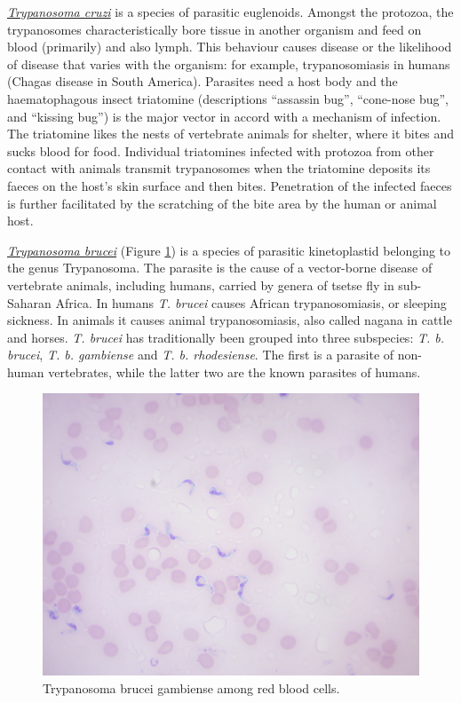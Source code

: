 \href{https://en.wikipedia.org/wiki/Trypanosoma_cruzi}{\emph{Trypanosoma
cruzi}} is a species of parasitic euglenoids. Amongst the protozoa, the
trypanosomes characteristically bore tissue in another organism and feed
on blood (primarily) and also lymph. This behaviour causes disease or
the likelihood of disease that varies with the organism: for example,
trypanosomiasis in humans (Chagas disease in South America). Parasites
need a host body and the haematophagous insect triatomine (descriptions
``assassin bug'', ``cone-nose bug'', and ``kissing bug'') is the major
vector in accord with a mechanism of infection. The triatomine likes the
nests of vertebrate animals for shelter, where it bites and sucks blood
for food. Individual triatomines infected with protozoa from other
contact with animals transmit trypanosomes when the triatomine deposits
its faeces on the host's skin surface and then bites. Penetration of the
infected faeces is further facilitated by the scratching of the bite
area by the human or animal host.

\href{https://en.wikipedia.org/wiki/Trypanosoma_brucei}{\emph{Trypanosoma
brucei}} (Figure \ref{fig:gambiense}) is a species of parasitic
kinetoplastid belonging to the genus Trypanosoma. The parasite is the
cause of a vector-borne disease of vertebrate animals, including humans,
carried by genera of tsetse fly in sub-Saharan Africa. In humans
\emph{T. brucei} causes African trypanosomiasis, or sleeping sickness.
In animals it causes animal trypanosomiasis, also called nagana in
cattle and horses. \emph{T. brucei} has traditionally been grouped into
three subspecies: \emph{T. b. brucei}, \emph{T. b. gambiense} and
\emph{T. b. rhodesiense}. The first is a parasite of non-human
vertebrates, while the latter two are the known parasites of humans.

\begin{figure}

{\centering \includegraphics[width=0.7\linewidth]{./figures/protists/gambiense}

}

\caption{Trypanosoma brucei gambiense among red blood cells.}\label{fig:gambiense}
\end{figure}


